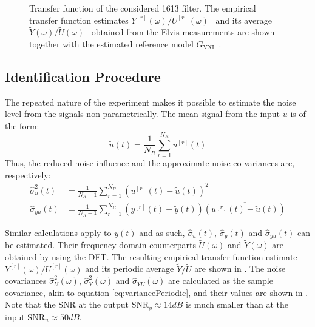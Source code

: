 \begin{figure}
  \centering
  \setlength{\figurewidth}{0.75\onecolumnwidth}
  \setlength{\figureheight}{0.68\figurewidth}
  \caption[\BK{} 1613 filter transfer function]{Transfer function of the considered \BK{} 1613 filter.
  The empirical transfer function estimates $Y^{[r]}(\omega)/U^{[r]}(\omega)$~ and its average $\tilde{Y}(\omega)/\tilde{U}(\omega)$~ obtained from the Elvis measurements are shown together with the estimated reference model $G_{\mathrm{VXI}}$~.} 
  \label{fig:bk1613}
\end{figure}


\subsection{Identification Procedure}
The repeated nature of the experiment makes it possible to estimate the noise level from the signals non-parametrically.
The mean signal from the input $u$ is of the form:
\begin{equation}
  \tilde{u}(t) = \frac{1}{N_R} \sum_{r=1}^{N_R} u^{[r]}(t)
\end{equation}
Thus, the reduced noise influence and the approximate noise co-variances are, respectively:
\begin{align}
  \hat\sigma_{u}^2(t) &= \frac{1}{N_R - 1} 
                    \sum_{r=1}^{N_R} 
                    \left( u^{[r]}(t) - \tilde{u}(t) \right)^2 \\
  \hat\sigma_{yu}(t) &= \frac{1}{N_R - 1} 
                    \sum_{r=1}^{N_R} 
                    \left( y^{[r]}(t) - \tilde{y}(t) \right)
                    \overline{\left( u^{[r]}(t) - \tilde{u}(t) \right)}
  \label{eq:variancePeriodic}            
\end{align}
 
Similar calculations apply to $y(t)$ and as such, $\hat\sigma_u(t)$, $\hat\sigma_y(t)$ and $\hat\sigma_{yu}(t)$ can be estimated.
Their frequency domain counterparts $\tilde{U}(\omega)$ and $\tilde{Y}(\omega)$ are obtained by using the DFT.
The resulting empirical transfer function estimate $Y^{[r]}(\omega)/U^{[r]}(\omega)$ and its periodic average $\tilde{Y}/\tilde{U}$ are shown in .
The noise covariances $\hat\sigma^2_{U}(\omega)$, $\hat\sigma^2_{Y}(\omega)$ and  $\hat\sigma_{YU}(\omega)$ are calculated as the sample covariance, akin to equation \eqref{eq:variancePeriodic}, and their values are shown in .
Note that the SNR at the output $\mathrm{SNR}_{y} \approx 14 \unit{dB}$ is much smaller than at the input $\mathrm{SNR}_{u} \approx 50 \unit{dB}$.

